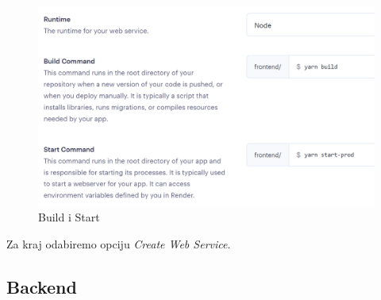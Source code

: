 			\begin{figure}[H]
				\includegraphics[scale=0.6]{slike/frontend_2.PNG} 
				\centering
				\caption{Build i Start}
				\label{frontend_2}
			\end{figure}
			
			Za kraj odabiremo opciju \textit{Create Web Service}.
			
			\subsection{Backend}
			
			\eject 